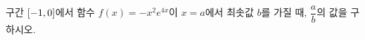 구간 $[-1{,}\mkern3mu\mathopen{}0]$에서 함수 $f(x)=-x^2e^{4x}$이 $x=a$에서 최솟값 $b$를 가질 때, $\dfrac{a}{b}$의 값을 구하시오.
